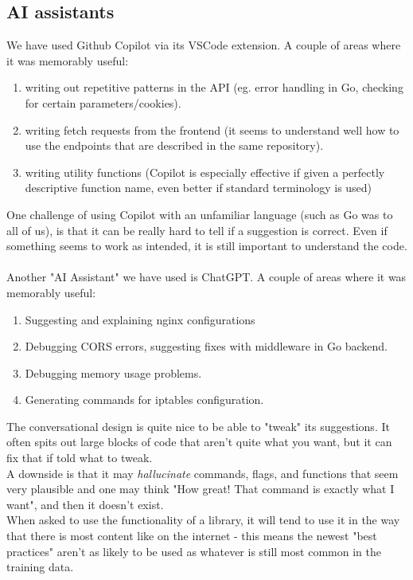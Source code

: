 \subsection{AI assistants}
We have used Github Copilot via its VSCode extension.
A couple of areas where it was memorably useful:
\begin{enumerate}
    \item writing out repetitive patterns in the API (eg. error handling in Go, checking for certain parameters/cookies).
    \item writing fetch requests from the frontend (it seems to understand well how to use the endpoints that are described in the same repository).
    \item writing utility functions (Copilot is especially effective if given a perfectly descriptive function name, even better if standard terminology is used)
\end{enumerate} 
One challenge of using Copilot with an unfamiliar language (such as Go was to all of us), is that it can be really hard to tell if a suggestion is correct. Even if something seems to work as intended, it is still important to understand the code. \\\\
Another "AI Assistant" we have used is ChatGPT. A couple of areas where it was memorably useful: 
\begin{enumerate}
    \item Suggesting and explaining nginx configurations
    \item Debugging CORS errors, suggesting fixes with middleware in Go backend.
    \item Debugging memory usage problems. 
    \item Generating commands for iptables configuration.
\end{enumerate}
The conversational design is quite nice to be able to "tweak" its suggestions. It often spits out large blocks of code that aren't quite what you want, but it can fix that if told what to tweak. \\
A downside is that it may \textit{hallucinate} commands, flags, and functions that seem very plausible and one may think "How great! That command is exactly what I want", and then it doesn't exist. \\
When asked to use the functionality of a library, it will tend to use it in the way that there is most content like on the internet - this means the newest "best practices" aren't as likely to be used as whatever is still most common in the training data.  